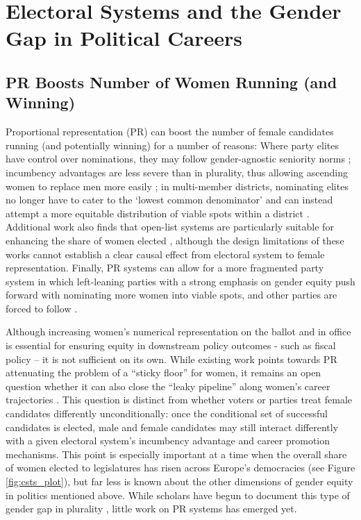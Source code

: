 \documentclass[12pt]{article}
\begin{document}

\section{Electoral Systems and the Gender Gap in Political Careers}


\subsection{PR Boosts Number of Women Running (and Winning)}

Proportional representation (PR) can boost the number of female candidates running (and potentially winning) for a number of reasons: Where party elites have control over nominations, they may follow gender-agnostic seniority norms \citep{fiva2018a,cirone2020}; incumbency advantages are less severe than in plurality, thus allowing ascending women to replace men more easily \citep{fiva2018b,meserve2020}; in multi-member districts, nominating elites no longer have to cater to the `lowest common denominator' and can instead attempt a more equitable distribution of viable spots within a district \citep{matland1998}. Additional work also finds that open-list systems are particularly suitable for enhancing the share of women elected \citep{stegmaier2014women,golder2017a}, although the design limitations of these works cannot establish a clear causal effect from electoral system to female representation. Finally, PR systems can allow for a more fragmented party system in which left-leaning parties with a strong emphasis on gender equity push forward with nominating more women into viable spots, and other parties are forced to follow \citep{matland1996}.

Although increasing women's numerical representation on the ballot and in office is essential for ensuring equity in downstream policy outcomes - such as fiscal policy \citep{bagues2020} -- it is not sufficient on its own. While existing work points towards PR attenuating the problem of a ``sticky floor'' for women, it remains an open question whether it can also close the ``leaky pipeline'' along women's career trajectories \citep{cipullo2021}. This question is distinct from whether voters or parties treat female candidates differently unconditionally: once the conditional set of successful candidates is elected, male and female candidates may still interact differently with a given electoral system's incumbency advantage and career promotion mechanisms. This point is especially important at a time when the overall share of women elected to legislatures has risen across Europe's democracies (see Figure \ref{fig:csts_plot}), but far less is known about the other dimensions of gender equity in politics mentioned above. While scholars have begun to document this type of gender gap in plurality \citep{wasserman2020,cipullo2021}, little work on PR systems has emerged yet.
\end{document}
